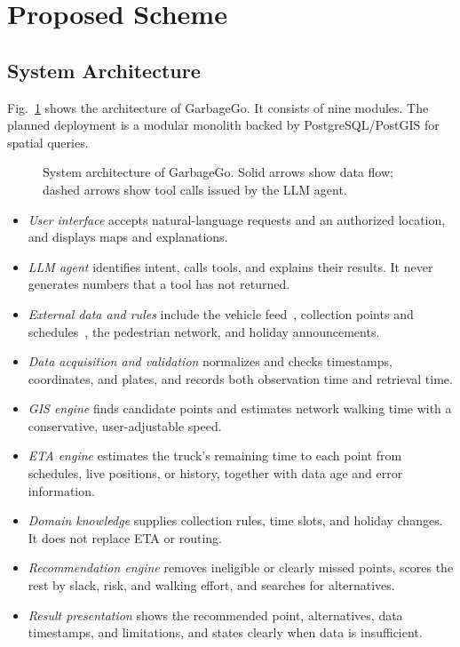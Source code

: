 \section{Proposed Scheme}\label{sec:scheme}

\subsection{System Architecture}
Fig.~\ref{fig:arch} shows the architecture of GarbageGo. It consists of
nine modules. The planned deployment is a modular monolith backed by
PostgreSQL/PostGIS for spatial queries.

\begin{figure}[htbp]
\centerline{}
\caption{System architecture of GarbageGo. Solid arrows show data flow;
dashed arrows show tool calls issued by the LLM agent.}
\label{fig:arch}
\end{figure}

\begin{itemize}
  \item {} \emph{User interface} accepts natural-language requests
        and an authorized location, and displays maps and explanations.
  \item {} \emph{LLM agent} identifies intent, calls tools, and
        explains their results. It never generates numbers that a tool
        has not returned.
  \item {} \emph{External data and rules} include the vehicle
        feed~\cite{dataset83558}, collection points and schedules~\cite{dataset84004},
        the pedestrian network, and holiday announcements.
  \item {} \emph{Data acquisition and validation} normalizes and
        checks timestamps, coordinates, and plates, and records both
        observation time and retrieval time.
  \item {} \emph{GIS engine} finds candidate points and estimates
        network walking time with a conservative, user-adjustable speed.
  \item {} \emph{ETA engine} estimates the truck's remaining time to
        each point from schedules, live positions, or history, together
        with data age and error information.
  \item {} \emph{Domain knowledge} supplies collection rules, time
        slots, and holiday changes. It does not replace ETA or routing.
  \item {} \emph{Recommendation engine} removes ineligible or
        clearly missed points, scores the rest by slack, risk, and
        walking effort, and searches for alternatives.
  \item {} \emph{Result presentation} shows the recommended point,
        alternatives, data timestamps, and limitations, and states
        clearly when data is insufficient.
\end{itemize}

